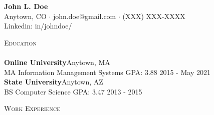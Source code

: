 \documentclass[a4paper]{article}
\newcommand{\lineunder} {
    \vspace*{-8pt} \\
    \hspace*{-18pt} \hrulefill \\
}
\newcommand{\header} [1] {
    {\hspace*{-18pt}\vspace*{6pt} \textsc{#1}}
    \vspace*{-6pt} \lineunder
}
\begin{document}
\vspace*{-40pt}

    

\vspace*{-10pt}
\begin{center}
	{\Huge \bfseries {John L. Doe}}\\
	Anytown, CO $\cdot$ john.doe@gmail.com $\cdot$ (XXX) XXX-XXXX\\
	Linkedin: in/johndoe/
\end{center}

\header{Education}
\textbf{Online University}\hfill Anytown, MA\\
MA Information Management Systems \textrm{GPA: 3.88} \hfill 2015 - May 2021\\
\vspace{2mm}
\textbf{State University}\hfill Anytown, AZ\\
BS Computer Science \textrm{GPA: 3.47} \hfill 2013 - 2015\\
\vspace{2mm}

\header{Work Experience}
\vspace{1mm}
\end{document}
